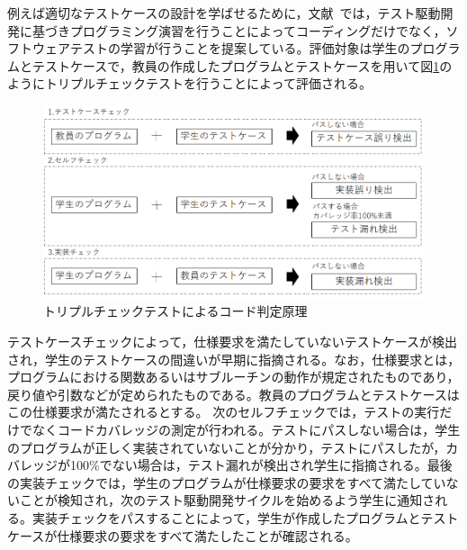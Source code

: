 \documentclass{tpu-sotu}
\begin{document}
例えば適切なテストケースの設計を学ばせるために，文献~\cite{a0}では，テスト駆動開発に基づきプログラミング演習を行うことによってコーディングだけでなく，ソフトウェアテストの学習が行うことを提案している。評価対象は学生のプログラムとテストケースで，教員の作成したプログラムとテストケースを用いて図\ref{a2}のようにトリプルチェックテストを行うことによって評価される。
\begin{figure}[h]
  \centering
  \includegraphics[width=130mm]{トリプルチェック.png}
  \caption{トリプルチェックテストによるコード判定原理}
  \label{a2}
\end{figure}
テストケースチェックによって，仕様要求を満たしていないテストケースが検出され，学生のテストケースの間違いが早期に指摘される。なお，仕様要求とは，プログラムにおける関数あるいはサブルーチンの動作が規定されたものであり，戻り値や引数などが定められたものである。教員のプログラムとテストケースはこの仕様要求が満たされるとする。
次のセルフチェックでは，テストの実行だけでなくコードカバレッジの測定が行われる。テストにパスしない場合は，学生のプログラムが正しく実装されていないことが分かり，テストにパスしたが，カバレッジが100\%でない場合は，テスト漏れが検出され学生に指摘される。最後の実装チェックでは，学生のプログラムが仕様要求の要求をすべて満たしていないことが検知され，次のテスト駆動開発サイクルを始めるよう学生に通知される。実装チェックをパスすることによって，学生が作成したプログラムとテストケースが仕様要求の要求をすべて満たしたことが確認される。
\end{document}
